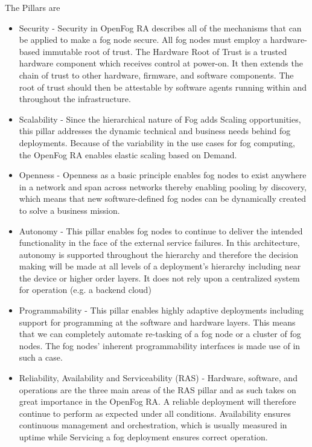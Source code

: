 \documentclass{article}
\begin{document}
The Pillars\cite{openfogconsortium2017} are 
\begin{itemize}
\item Security - Security in OpenFog RA describes all of the mechanisms that can be applied to make a fog node secure. All fog nodes must employ a hardware-based immutable root of trust. The Hardware Root of Trust is a trusted hardware component which receives control at power-on. It then extends the chain of trust to other hardware, firmware, and software components. The root of trust should then be attestable by software agents running within and throughout the infrastructure.

\item Scalability - Since the hierarchical nature of Fog adds Scaling opportunities, this pillar addresses the dynamic technical and business needs behind fog deployments. Because of the variability in the use cases for fog computing, the OpenFog RA enables elastic scaling based on Demand.

\item Openness - Openness as a basic principle enables fog nodes to exist anywhere in a network and span across networks thereby enabling pooling by discovery, which means that new software-defined fog nodes can be dynamically created to solve a business mission.

\item Autonomy - This pillar enables fog nodes to continue to deliver the intended functionality in the face of the external service failures. In this architecture, autonomy is supported throughout the hierarchy and therefore the decision making will be made at all levels of a deployment’s hierarchy including near the device or higher order layers. It does not rely upon a centralized system for operation (e.g. a backend cloud)

\item Programmability - This pillar enables highly adaptive deployments including support for programming at the software and hardware layers. This means that we can completely automate re-tasking of a fog node or a cluster of fog nodes. The fog nodes' inherent programmability interfaces is made use of in such a case.

\item Reliability, Availability and Serviceability (RAS) - Hardware, software, and operations are the three main areas of the RAS pillar and as such takes on great importance in the OpenFog RA. 
A reliable deployment will therefore continue to perform as expected under all conditions. Availability ensures continuous management and orchestration, which is usually measured in uptime while Servicing a fog deployment ensures correct operation.


\end{itemize}
\end{document}
